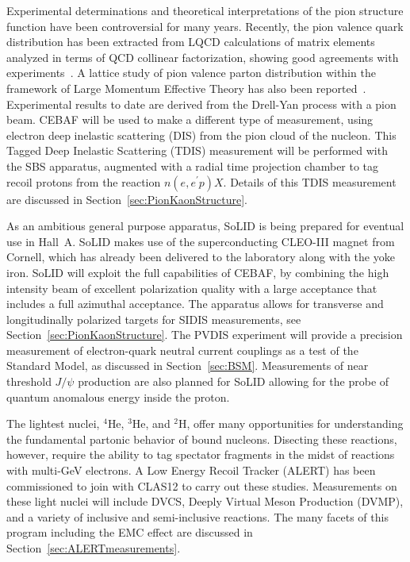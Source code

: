 Experimental determinations and theoretical interpretations of 
the pion structure function have been controversial for many years. 
Recently, the pion valence quark distribution has been extracted from 
LQCD calculations of matrix elements analyzed in terms of QCD collinear 
factorization, showing good agreements with experiments~\cite{PhysRevD.102.054508}. 
A lattice study of pion valence parton distribution within the framework of Large Momentum Effective Theory has also been reported~\cite{PhysRevD.100.034516}.
Experimental results to date are derived from the Drell-Yan process with a pion beam. CEBAF will be used to make a different type of measurement, using electron deep inelastic scattering (DIS) from the pion cloud of the nucleon. This Tagged Deep Inelastic Scattering (TDIS) measurement will be performed with the SBS apparatus, augmented with a radial time projection chamber to tag recoil protons from the reaction $n(e,e^\prime p)X$. 
Details of this TDIS measurement are discussed in Section~\ref{sec:PionKaonStructure}.

As an ambitious general purpose apparatus,  %
SoLID is being prepared for eventual use in Hall~A. SoLID makes use of the superconducting CLEO-III magnet from Cornell, which has already been delivered to the laboratory along with the yoke iron. SoLID will exploit the full capabilities of CEBAF, by combining the high intensity beam of excellent polarization quality with a large acceptance that includes a full azimuthal acceptance. %
The apparatus allows for transverse and longitudinally polarized targets for SIDIS measurements, see Section~\ref{sec:PionKaonStructure}. The PVDIS experiment will provide a precision measurement of %
electron-quark neutral current couplings as a test of the Standard Model, as discussed in Section~\ref{sec:BSM}. Measurements of near threshold $J/\psi$ production are also planned for SoLID allowing for the probe of quantum anomalous energy inside the proton.

The lightest nuclei, $^4$He, $^3$He, and $^2$H, offer many opportunities for understanding the fundamental partonic behavior of bound nucleons. Disecting these reactions, however, require the ability to tag spectator fragments in the midst of reactions with multi-GeV electrons. A Low Energy Recoil Tracker (ALERT) has been commissioned to join with CLAS12 to carry out these studies. Measurements on these light nuclei will include %
DVCS, Deeply Virtual Meson Production (DVMP), and a variety of inclusive and semi-inclusive reactions. The many facets of this program including the EMC effect are discussed in Section~\ref{sec:ALERTmeasurements}.

